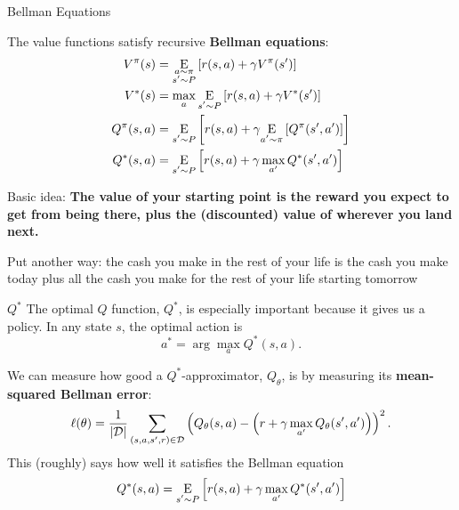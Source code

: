 \begin{frame}{Bellman Equations}

The value functions satisfy recursive \textbf{Bellman equations}:
%
\begin{align*}
V^{\pi}(s) &= \underset{\begin{subarray}{c}a \sim \pi \\ s'\sim P \end{subarray}}{{\mathrm E}}\left[ r(s,a) + \gamma V^{\pi}(s') \right] \\
V^*(s) &= \max_a \underset{\begin{subarray}{c}s'\sim P \end{subarray}}{{\mathrm E}}\left[ r(s,a) + \gamma V^*(s') \right] \\
Q^{\pi}(s,a) &= \underset{\begin{subarray}{c}s'\sim P \end{subarray}}{{\mathrm E}}\left[ r(s,a) + \gamma \underset{\begin{subarray}{c}a'\sim \pi \end{subarray}}{{\mathrm E}}\left[ Q^{\pi}(s',a') \right] \right] \\
Q^*(s,a) &= \underset{\begin{subarray}{c}s'\sim P \end{subarray}}{{\mathrm E}}\left[ r(s,a) + \gamma \max_{a'} Q^*(s',a') \right]
\end{align*}

Basic idea: \textbf{The value of your starting point is the reward you expect to get from being there, plus the (discounted) value of wherever you land next.}

\vspace{2em}

Put another way: the cash you make in the rest of your life is the cash you make today plus all the cash you make for the rest of your life starting tomorrow

\end{frame}

%

\begin{frame}{$Q^*$}
The optimal $Q$ function, $Q^*$, is especially important because it gives us a policy. In any state $s$, the optimal action is
%
\begin{equation*}
a^* = \arg \max_a Q^* (s, a).
\end{equation*}

We can measure how good a $Q^*$-approximator, $Q_{\theta}$, is by measuring its \textbf{mean-squared Bellman error}:
%
\begin{equation*}
\ell(\theta) = \frac{1}{|{\mathcal D}|} \sum_{(s,a,s',r) \in {\mathcal D}} \left( Q_{\theta}(s,a) - \left(r + \gamma \max_{a'} Q_{\theta}(s',a')\right)\right)^2.
\end{equation*}
%
This (roughly) says how well it satisfies the Bellman equation
%
\begin{equation*}
Q^*(s,a) = \underset{\begin{subarray}{c}s'\sim P \end{subarray}}{{\mathrm E}}\left[ r(s,a) + \gamma \max_{a'} Q^* (s',a') \right]
\end{equation*}

\end{frame}